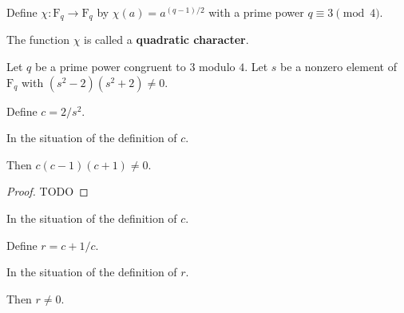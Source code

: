 %

\begin{definition}
  \label{def:LegendreSymbol.χ}
  \leanok
    Define $\chi : \text{F}_q \to \text{F}_q$ by $\chi (a) = a^{(q - 1) / 2}$ with a prime power $q \equiv 3 \pmod{4}$.

    The function $\chi$ is called a \textbf{quadratic character}.
\end{definition}

\begin{definition}
  \label{def:Elligator1.c}
  \leanok
    Let $q$ be a prime power congruent to $3$ modulo $4$.
    Let $s$ be a nonzero element of $\text{F}_q$ with $(s^2 - 2) (s^2 + 2) \neq 0$.

    Define $c = 2 / s^2$.
\end{definition}

\begin{theorem}[c Property]
  \label{thm:Elligator1.c_h}
  \leanok
  In the situation of the definition of $c$.

  Then $c (c - 1) (c + 1) \neq 0$.
\end{theorem}

\begin{proof}
  \leanok
  TODO
\end{proof}

\begin{definition}
  \label{def:Elligator1.r}
  \leanok
  In the situation of the definition of $c$.

  Define $r = c + 1 / c$.
\end{definition}

\begin{theorem}[r nonzero]
  \label{thm:Elligator1.r_ne_zero}
  \leanok
  In the situation of the definition of $r$.

  Then $r \neq 0$.
\end{theorem}

